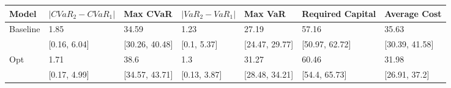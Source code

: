 \begin{tabular}{lllllll}
\toprule
   Model & $|CVaR_2 - CVaR_1|$ &       Max CVaR & $|VaR_2 - VaR_1|$ &        Max VaR & Required Capital &   Average Cost \\
\midrule
Baseline &                1.85 &          34.59 &              1.23 &          27.19 &            57.16 &          35.63 \\
         &        [0.16, 6.04] & [30.26, 40.48] &       [0.1, 5.37] & [24.47, 29.77] &   [50.97, 62.72] & [30.39, 41.58] \\
     Opt &                1.71 &           38.6 &               1.3 &          31.27 &            60.46 &          31.98 \\
         &        [0.17, 4.99] & [34.57, 43.71] &      [0.13, 3.87] & [28.48, 34.21] &    [54.4, 65.73] &  [26.91, 37.2] \\
\bottomrule
\end{tabular}
